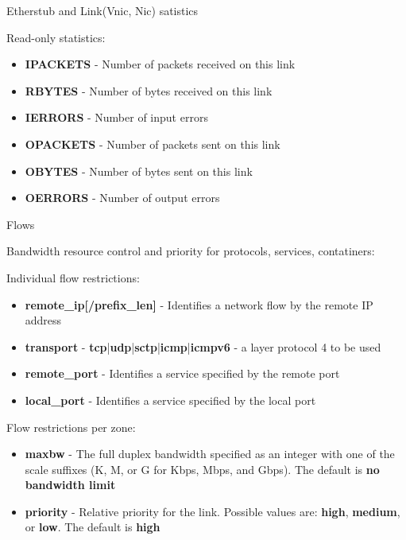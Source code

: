 \documentclass{beamer}
\begin{document}
		\begin{frame}{Etherstub and Link(Vnic, Nic) satistics }

			Read-only statistics:
			
			\begin{itemize}

				\item \textbf{IPACKETS} - Number of packets received on this link
				\item \textbf{RBYTES} - Number of bytes received on this link
				\item \textbf{IERRORS} - Number of input errors
				\item \textbf{OPACKETS} - Number of packets sent on this link
				\item \textbf{OBYTES} - Number of bytes sent on this link
				\item \textbf{OERRORS} - Number of output errors
			
			\end{itemize}

		\end{frame}

		\begin{frame}{Flows}

			Bandwidth resource control and priority for protocols, services, contatiners:

			Individual flow restrictions:
			\begin{itemize}

				\item \textbf{remote_ip[/prefix_len]} - Identifies a network flow by the remote IP address
				\item \textbf{transport} - \textbf{tcp}|\textbf{udp}|\textbf{sctp}|\textbf{icmp}|\textbf{icmpv6} - a layer protocol 4 to be used
				\item \textbf{remote_port} - Identifies a service specified by the remote port
				\item \textbf{local_port} - Identifies a service specified by the local port

			
			\end{itemize}
			

			Flow restrictions per zone:
			\begin{itemize}

				\item \textbf{maxbw} - The full duplex bandwidth specified as an integer with one of the scale suffixes (K, M, or G for Kbps, Mbps, and Gbps). The default is \textbf{no bandwidth limit}
				\item \textbf{priority} - Relative priority for the link. Possible values are: \textbf{high}, \textbf{medium}, or \textbf{low}. The default is \textbf{high}

			
			\end{itemize}

		\end{frame}
\end{document}
